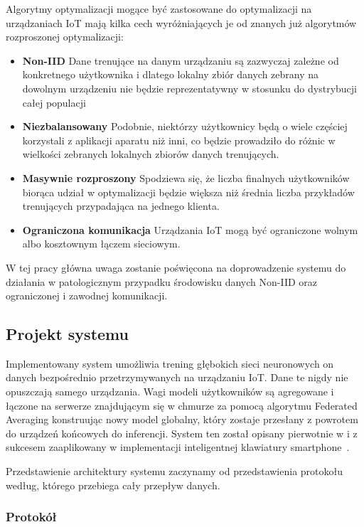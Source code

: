 Algorytmy optymalizacji mogące być zastosowane do optymalizacji na urządzaniach IoT mają kilka cech wyróżniających je od znanych już algorytmów rozproszonej optymalizacji:
\begin{itemize}

\item \textbf{Non-IID} Dane trenujące na danym urządzaniu są zazwyczaj zależne od konkretnego użytkownika i dlatego lokalny zbiór danych zebrany na dowolnym urządzeniu nie będzie reprezentatywny w stosunku do dystrybucji całej populacji
\item \textbf{Niezbalansowany} Podobnie, niektórzy użytkownicy będą o wiele częściej korzystali z aplikacji aparatu niż inni, co będzie prowadziło do różnic w wielkości zebranych lokalnych zbiorów  danych trenujących.
\item \textbf{Masywnie rozproszony} Spodziewa się, że liczba finalnych użytkowników biorąca udział w optymalizacji będzie większa niż średnia liczba przykładów trenujących przypadająca na jednego klienta.
\item \textbf{Ograniczona komunikacja} Urządzania IoT mogą być ograniczone wolnym albo kosztownym łączem sieciowym.
\end{itemize}

W tej pracy główna uwaga zostanie poświęcona na doprowadzenie systemu do działania w patologicznym przypadku środowisku danych Non-IID oraz ograniczonej i zawodnej komunikacji.


\subsection{Projekt systemu}

Implementowany system umożliwia trening głębokich sieci neuronowych on danych bezpośrednio przetrzymywanych na
urządzaniu IoT. Dane te nigdy nie opuszczają samego urządzania. Wagi modeli użytkowników są
agregowane i łączone na serwerze znajdującym się w chmurze za pomocą algorytmu Federated
Averaging konstruując nowy model globalny, który zostaje przesłany z powrotem do urządzeń końcowych
do inferencji. System ten został opisany pierwotnie w \cite{FLBasic} i z sukcesem zaaplikowany w
implementacji inteligentnej klawiatury smartphone~\cite{FLBlog}.


Przedstawienie architektury systemu zaczynamy od przedstawienia protokołu według, którego przebiega cały przepływ danych.

\subsubsection{Protokół}

